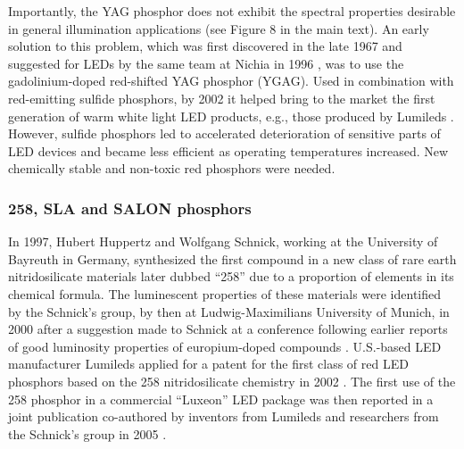 \documentclass[10pt]{article}
\begin{document}
Importantly, the YAG phosphor does not exhibit the spectral properties desirable in general illumination applications (see Figure 8 in the main text). An early solution to this problem, which was first discovered in the late 1967 \cite{holloway1969optical} and suggested for LEDs by the same team at Nichia in 1996 \cite{bando1998development}\cite{shimizu1999light}, was to use the gadolinium-doped red-shifted YAG phosphor (YGAG). Used in combination with red-emitting sulfide phosphors, by 2002 it helped bring to the market the first generation of warm white light LED products, e.g., those produced by Lumileds \cite{Mueller2002}. However, sulfide phosphors led to accelerated deterioration of sensitive parts of LED devices and became less efficient as operating temperatures increased. New chemically stable and non-toxic red phosphors were needed. 

\subsubsection{258, SLA and SALON phosphors}

In 1997, Hubert Huppertz and Wolfgang Schnick, working at the University of Bayreuth in Germany, synthesized the first compound in a new class of rare earth nitridosilicate materials \cite{Huppertz1997} later dubbed “258” due to a proportion of elements in its chemical formula. The luminescent properties of these materials were identified by the Schnick’s group, by then at Ludwig-Maximilians University of Munich, in 2000 \cite{Hppe2000} after a suggestion made to Schnick at a conference following earlier reports of good luminosity properties of europium-doped compounds \cite{Qiua1998}. U.S.-based LED manufacturer Lumileds applied for a patent for the first class of red LED phosphors based on the 258 nitridosilicate chemistry in 2002 \cite{mueller2004phosphor}. The first use of the 258 phosphor in a commercial “Luxeon” LED package was then reported in a joint publication co-authored by inventors from Lumileds and researchers from the Schnick’s group in 2005 \cite{MuellerMach2005}.
\end{document}
